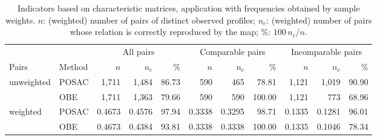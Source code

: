 \begin{table}[ht]
\centering
\caption{Indicators based on characteristic matrices, application with frequencies obtained by sample weights. $n$: (weighted) number of pairs of distinct observed profiles; $n_c$: (weighted) number of pairs whose relation is correctly reproduced by the map; \%: $100\,n_c/n$.}
\label{tab:incW}
\footnotesize
\setlength{\tabcolsep}{3pt}
\begin{tabular}{llrrrrrrrrr}
\hline
 & & \multicolumn{3}{c}{All pairs} & \multicolumn{3}{c}{Comparable pairs} & \multicolumn{3}{c}{Incomparable pairs}\\
Pairs & Method & $n$ & $n_{c}$ & \% & $n$ & $n_{c}$ & \% & $n$ & $n_{c}$ & \% \\
\hline
unweighted & POSAC & 1,711 & 1,484 & 86.73 & 590 & 465 & 78.81 & 1,121 & 1,019 & 90.90\\
 & OBE & 1,711 & 1,363 & 79.66 & 590 & 590 & 100.00 & 1,121 & 773 & 68.96\\
\hline
weighted & POSAC & 0.4673 & 0.4576 & 97.94 & 0.3338 & 0.3295 & 98.71 & 0.1335 & 0.1281 & 96.01\\
 & OBE & 0.4673 & 0.4384 & 93.81 & 0.3338 & 0.3338 & 100.00 & 0.1335 & 0.1046 & 78.34\\
\hline
\end{tabular}
\end{table}
